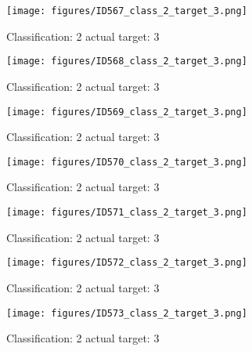 \begin{figure}[h!]
\begin{center}
\texttt{[image: figures/ID567\_class\_2\_target\_3.png]}
\end{center}
\caption{ Classification: 2 actual target: 3}
\label{fig:ID567_class_2_target_3}
\end{figure}
\begin{figure}[h!]
\begin{center}
\texttt{[image: figures/ID568\_class\_2\_target\_3.png]}
\end{center}
\caption{ Classification: 2 actual target: 3}
\label{fig:ID568_class_2_target_3}
\end{figure}
\begin{figure}[h!]
\begin{center}
\texttt{[image: figures/ID569\_class\_2\_target\_3.png]}
\end{center}
\caption{ Classification: 2 actual target: 3}
\label{fig:ID569_class_2_target_3}
\end{figure}
\begin{figure}[h!]
\begin{center}
\texttt{[image: figures/ID570\_class\_2\_target\_3.png]}
\end{center}
\caption{ Classification: 2 actual target: 3}
\label{fig:ID570_class_2_target_3}
\end{figure}
\begin{figure}[h!]
\begin{center}
\texttt{[image: figures/ID571\_class\_2\_target\_3.png]}
\end{center}
\caption{ Classification: 2 actual target: 3}
\label{fig:ID571_class_2_target_3}
\end{figure}
\begin{figure}[h!]
\begin{center}
\texttt{[image: figures/ID572\_class\_2\_target\_3.png]}
\end{center}
\caption{ Classification: 2 actual target: 3}
\label{fig:ID572_class_2_target_3}
\end{figure}
\begin{figure}[h!]
\begin{center}
\texttt{[image: figures/ID573\_class\_2\_target\_3.png]}
\end{center}
\caption{ Classification: 2 actual target: 3}
\label{fig:ID573_class_2_target_3}
\end{figure}
